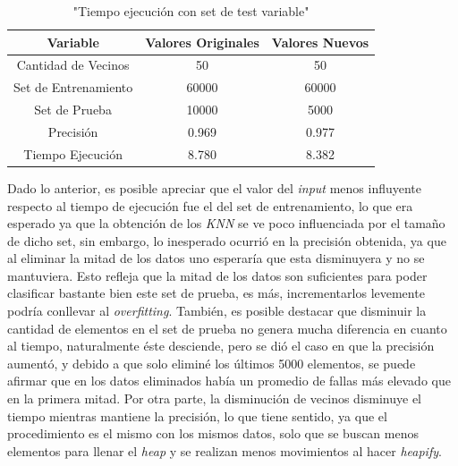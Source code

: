 \documentclass[12pt]{article}
\begin{document}
\newpage
\begin{center}
    \begin{table}[h]
        \caption{"Tiempo ejecución con set de test variable"}
        \centering
        \begin{tabular} {| c | c | c |}
            \hline
            Variable & Valores Originales & Valores Nuevos \\
            \hline \hline
            Cantidad de Vecinos & 50 & 50  \\
            Set de Entrenamiento & 60000 & 60000\\
            Set de Prueba & 10000 & 5000 \\
            \hline
            Precisión & 0.969 & 0.977 \\
            Tiempo Ejecución & 8.780 & 8.382 \\
            \hline
        \end{tabular}
    \end{table}
\end{center}
\hspace{5mm}
Dado lo anterior, es posible apreciar que el valor del \textit{input} menos influyente respecto al tiempo de 
ejecución fue el del set de entrenamiento, lo que era esperado ya que la obtención de los \textit{KNN} se ve 
poco influenciada por el tamaño de dicho set, sin embargo, lo inesperado ocurrió en la precisión obtenida, ya 
que al eliminar la mitad de los datos uno esperaría que esta disminuyera y no se mantuviera. Esto refleja que
la mitad de los datos son suficientes para poder clasificar bastante bien este set de prueba, es más, 
incrementarlos levemente podría conllevar al \textit{overfitting}. También, es posible destacar que disminuir 
la cantidad de elementos en el set de prueba no genera mucha diferencia en cuanto al tiempo, naturalmente 
éste desciende, pero se dió el caso en que la precisión aumentó, y debido a que solo eliminé los últimos 5000 
elementos, se puede afirmar que en los datos eliminados había un promedio de fallas más elevado que en la primera
mitad. Por otra parte, la disminución de vecinos disminuye el tiempo mientras mantiene la precisión, lo que tiene 
sentido, ya que el procedimiento es el mismo con los mismos datos, solo que se buscan menos elementos para llenar 
el \textit{heap} y se realizan menos movimientos al hacer \textit{heapify}.
\end{document}
